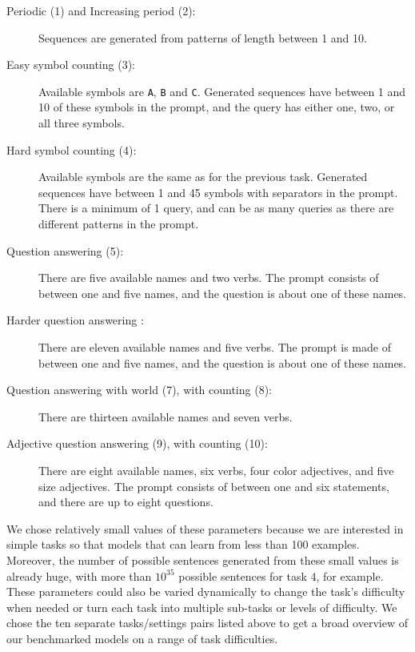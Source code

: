 \begin{description}
  \item[Periodic (1) and Increasing period (2):] Sequences are generated from patterns of
        length between 1 and 10.
  \item[Easy symbol counting (3):] Available symbols are \texttt{A}, \texttt{B} and
        \texttt{C}. Generated sequences have between 1 and 10 of these symbols
        in the prompt, and the query has either one, two, or all three symbols.
  \item[Hard symbol counting (4):] Available symbols are the same as for the previous
        task. Generated sequences have between 1 and 45 symbols
        with separators in the prompt. There is a minimum of 1 query, and can be
        as many queries as there are different patterns in the prompt.
  \item[Question answering (5):] There are five available names and two verbs. The
        prompt consists of between one and five names, and the question is about one
        of these names.
  \item[Harder question answering :] There are eleven available names and five
        verbs. The prompt is made of between one and five names, and the
        question is about one of these names.
  \item[Question answering with world (7), with counting (8):] There are thirteen available
        names and seven verbs.
  \item[Adjective question answering (9), with counting (10):] There are eight
        available names, six verbs, four color adjectives, and five size
        adjectives. The prompt consists of between one and six statements, and
        there are up to eight questions.
\end{description}

We chose relatively small values of these parameters because we are interested in simple tasks
so that models that can learn from less than 100 examples. Moreover, the
number of possible sentences generated from these small values is already huge,
with more than $10^{35}$ possible sentences for task 4, for example. These
parameters could also be varied dynamically to change the task's difficulty when
needed or turn each task into multiple sub-tasks or levels of difficulty. We
chose the ten separate tasks/settings pairs listed above to get a broad overview of our
benchmarked models on a range of task difficulties.

